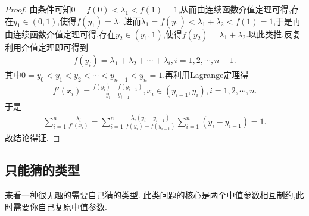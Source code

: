 \documentclass[../../main.tex]{subfiles}%
\begin{document}
\begin{proof}

由条件可知$0=f(0)<\lambda_1<f(1)=1$,从而由连续函数介值定理可得,存在$y_1\in (0,1)$,使得$f(y_1)=\lambda_1$.进而$\lambda_1=f(y_1)<\lambda_1+\lambda_2<f(1)=1$,于是再由连续函数介值定理可得,存在$y_2\in (y_1,1)$,使得$f(y_2)=\lambda_1+\lambda_2$.以此类推,反复利用介值定理即可得到
\begin{align*}
f(y_i)=\lambda_1+\lambda_2+\cdots+\lambda_i,i = 1,2,\cdots,n - 1.
\end{align*}
其中\(0 = y_0 < y_1 < y_2 < \cdots < y_{n - 1} < y_n = 1\).再利用Lagrange定理得
\begin{align*}
f'(x_i)=\frac{f(y_i)-f(y_{i - 1})}{y_i - y_{i - 1}},x_i\in(y_{i - 1},y_i),i = 1,2,\cdots,n.
\end{align*}
于是
\begin{align*}
\sum_{i = 1}^{n}\frac{\lambda_i}{f'(x_i)}=\sum_{i = 1}^{n}\frac{\lambda_i(y_i - y_{i - 1})}{f(y_i)-f(y_{i - 1})}\sum_{i = 1}^{n}(y_i - y_{i - 1}) = 1.
\end{align*}
故结论得证.

\end{proof}

\subsection{只能猜的类型}
来看一种很无趣的需要自己猜的类型. 此类问题的核心是两个中值参数相互制约,此时需要你自己复原中值参数.
\end{document}
